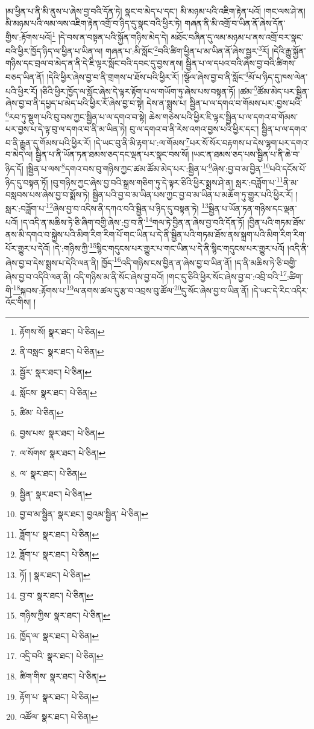 །མ་ཕྱིན་པ་ནི་མི་ནུས་པ་ཞེས་བྱ་བའི་དོན་ཏེ། སྣང་བ་མེད་པ་དང་། མི་མཉམ་པའི་འཇིག་རྟེན་པའོ། །གང་ལས་ཤེ་ན། མི་མཉམ་པའི་ལམ་ལས་འཇིག་རྟེན་འགྲོ་བ་ཉིད་དུ་སྣང་བའི་ཕྱིར་ཏེ། གཞན་ནི་མི་འགྲོ་བ་ཡིན་ནོ་ཞེས་དོན་གྱིས་:རྟོགས་པའོ།\footnote{རྟོགས་སོ།  སྣར་ཐང་།  པེ་ཅིན། } །དེ་བས་ན་བསྟན་པའི་སྐྱོན་གཉིས་མེད་དེ། མཐོང་བཞིན་དུ་ལམ་མཉམ་པ་ནས་འགྲོ་བར་སྣང་བའི་ཕྱིར་ཁྱོད་ཉིད་ལ་ཕྱིན་པ་ཡིན་ལ། གཞན་པ་:མི་སློང་\footnote{ནི་བསླང་  སྣར་ཐང་།  པེ་ཅིན། }བའི་ཚིག་ཕྱིན་པ་མ་ཡིན་ནོ་ཞེས་སྦྱར་\footnote{སྦྱོར་  སྣར་ཐང་།  པེ་ཅིན། }རོ། །དེའི་རྒྱུ་སྐྱོན་གཉིས་དང་བྲལ་བ་མེད་ན་ནི་དེ་ཇི་ལྟར་སློང་བའི་དབང་དུ་བྱས་ནས། སྦྱིན་པ་ལ་དཔའ་བའི་ཞེས་བྱ་བའི་ཚིགས་བཅད་ཡིན་ནོ། །དེའི་ཕྱིར་ཞེས་བྱ་བ་ནི་གྲགས་པ་ཐོས་པའི་ཕྱིར་རོ། །སྩོལ་ཞེས་བྱ་བ་ནི་སློང་\footnote{སློངས་  སྣར་ཐང་།  པེ་ཅིན། }མོ་པ་ཉིད་དུ་ཁས་ལེན་པའི་ཕྱིར་རོ། །ཅིའི་ཕྱིར་ཁྱོད་ལ་སློང་ཞེས་དེ་ལྟར་རྟོག་པ་ལ་གཡོག་ཏུ་ཞེས་པས་བསྟན་ཏོ། །ཚམ་\footnote{ཚིམ་  པེ་ཅིན། }ཚོམ་མེད་པར་སྦྱིན་ཞེས་བྱ་བ་ནི་དཔྱད་པ་མེད་པའི་ཕྱིར་རོ་ཞེས་བྱ་བ་སྟེ། དེས་ན་སྨྲས་པ། སྦྱིན་པ་ལ་དགའ་བ་གོམས་པར་:བྱས་པའི་\footnote{བྱས་པས་  སྣར་ཐང་།  པེ་ཅིན། }རབ་ཏུ་སྡུག་པའི་བུ་བས་ཀྱང་སྦྱིན་པ་ལ་དགའ་བ་སྟེ། ཆེས་གཅེས་པའི་ཕྱིར་ཇི་ལྟར་སྦྱིན་པ་ལ་དགའ་བ་གོམས་པར་བྱས་པ་དེ་ལྟ་བུ་ལ་དགའ་བ་ནི་མ་ཡིན་ཏེ། བུ་ལ་དགའ་བ་ནི་རེས་འགའ་བྱས་པའི་ཕྱིར་དང་། སྦྱིན་པ་ལ་དགའ་བ་ནི་རྒྱུན་དུ་གོམས་པའི་ཕྱིར་རོ། །དེ་ཡང་བུ་ནི་མི་རྟག་པ་:ལ་གོམས་\footnote{ལ་སོགས་  སྣར་ཐང་།  པེ་ཅིན། }པར་སོ་སོར་བརྟགས་པ་དེས་ལྷག་པར་དགའ་བ་མེད་ལ། སྦྱིན་པ་ནི་ཡོན་ཏན་ཐམས་ཅད་དང་ལྡན་པར་སྣང་བས་སོ། །ཡང་ན་ཐམས་ཅད་པས་སྦྱིན་པ་ནི་ཆེ་བ་ཉིད་དོ། །སྦྱིན་པ་ལས་\footnote{ལ་  སྣར་ཐང་།  པེ་ཅིན། }དགའ་བས་བུ་གཉིས་ཀྱང་ཚམ་ཚོམ་མེད་པར་:སྦྱིན་པ་\footnote{སྦྱིན་  སྣར་ཐང་།  པེ་ཅིན། }ཞེས་:བྱ་བ་མ་བྱིན་\footnote{བྱ་བ་མ་སྦྱིན་  སྣར་ཐང་། བྱའམ་སྦྱིན་  པེ་ཅིན། }པའི་དངོས་པོ་ཉིད་དུ་བསྟན་ཏོ། །བུ་གཉིས་ཀྱང་ཞེས་བྱ་བའི་སྒྲས་གཅིག་ཏུ་དེ་ལྟར་ཅིའི་ཕྱིར་སྨྲས་ཤེ་ན། སླར་:བཟློག་པ་\footnote{ཟློག་པ་  སྣར་ཐང་།  པེ་ཅིན། }ནི་མ་བསླབས་པས་ཞེས་བྱ་བ་སྨོས་ཏེ། སྦྱིན་པའི་བྱ་བ་མ་ཡིན་པས་ཀྱང་བྱ་བ་མ་ཡིན་པ་མཆོག་ཏུ་གྱུར་པའི་ཕྱིར་རོ། །སླར་:བཟློག་པ་\footnote{ཟློག་པ་  སྣར་ཐང་།  པེ་ཅིན། }ཞེས་བྱ་བ་འདིས་ནི་དཀའ་བའི་སྦྱིན་པ་ཉིད་དུ་བསྟན་ཏེ། \footnote{ཏོ། །   སྣར་ཐང་།  པེ་ཅིན། }སྦྱིན་པ་ཡོན་ཏན་གཉིས་དང་ལྡན་པའོ། །ད་འདི་ན་མཆིས་ཏེ་ཅི་ཞིག་བགྱི་ཞེས་:བྱ་བ་ནི་\footnote{བྱ་བ་  སྣར་ཐང་།  པེ་ཅིན། }གལ་ཏེ་བྱིན་ན་ཞེས་བྱ་བའི་དོན་ཏོ། །བྱིན་པའི་གཏམ་ཐོས་ནས་མི་དགའ་བ་སྐྱེས་པའི་མིག་རིག་རིག་པོ་གང་ཡིན་པ་དེ་ནི་སྦྱིན་པའི་གཏམ་ཐོས་ནས་སྐྲག་པའི་མིག་རིག་རིག་པོར་གྱུར་པ་དེའོ། །དེ་:གཉིས་ཀྱི་\footnote{གཉིས་ཀྱིས་  སྣར་ཐང་།  པེ་ཅིན། }སྙིང་གདུངས་པར་གྱུར་པ་གང་ཡིན་པ་དེ་ནི་སྙིང་གདུངས་པར་གྱུར་པའོ། །འདི་ནི་ཞེས་བྱ་བ་དེས་སྨྲས་པ་དེའི་ལན་ནི། ཁྱོད་\footnote{ཁྱོད་ལ་  སྣར་ཐང་།  པེ་ཅིན། }འདི་གཉིས་ངས་བྱིན་ན་ཞེས་བྱ་བ་ཡིན་ནོ། །ད་ནི་མཆིས་ཏེ་ཅི་བགྱི་ཞེས་བྱ་བ་འདིའི་ལན་ནི། འདི་གཉིས་མ་ནི་སོང་ཞེས་བྱ་བའོ། །གང་དུ་ཅིའི་ཕྱིར་སོང་ཞེས་བྱ་བ་:འབྲི་བའི་\footnote{འདྲི་བའི་  སྣར་ཐང་།  པེ་ཅིན། }:ཚིག་གི་\footnote{ཚིག་གིས་  སྣར་ཐང་།  པེ་ཅིན། }སྐབས་:རྟོགས་པ་\footnote{རྟོག་པ་  སྣར་ཐང་།  པེ་ཅིན། }ལ་ནགས་ཚལ་དུ་རྩ་བ་འབྲས་བུ་ཚོལ་\footnote{འཚོལ་  སྣར་ཐང་།  པེ་ཅིན། }དུ་སོང་ཞེས་བྱ་བ་ཡིན་ནོ། །དེ་ཡང་དེ་རིང་འདིར་འོང་གིས། །
